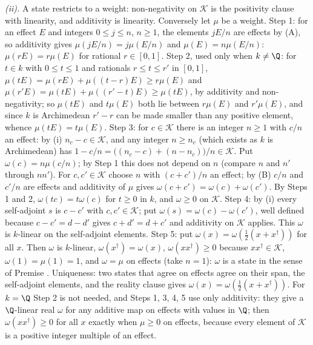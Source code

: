 \emph{(ii).} A state restricts to a weight: non-negativity on $\mathcal{K}$ is the positivity clause with linearity, and additivity is linearity. Conversely let $\mu$ be a weight. Step 1: for an effect $E$ and integers $0 \le j \le n$, $n \ge 1$, the elements $jE/n$ are effects by (A), so additivity gives $\mu(jE/n) = j\mu(E/n)$ and $\mu(E) = n\mu(E/n)$: $\mu(rE) = r\mu(E)$ for rational $r \in [0,1]$. Step 2, used only when $k \ne \Q$: for $t \in k$ with $0 \le t \le 1$ and rationals $r \le t \le r'$ in $[0,1]$, $\mu(tE) = \mu(rE) + \mu((t - r)E) \ge r\mu(E)$ and $\mu(r'E) = \mu(tE) + \mu((r' - t)E) \ge \mu(tE)$, by additivity and non-negativity; so $\mu(tE)$ and $t\mu(E)$ both lie between $r\mu(E)$ and $r'\mu(E)$, and since $k$ is Archimedean $r' - r$ can be made smaller than any positive element, whence $\mu(tE) = t\mu(E)$. Step 3: for $c \in \mathcal{K}$ there is an integer $n \ge 1$ with $c/n$ an effect: by (i) $n_{c} - c \in \mathcal{K}$, and any integer $n \ge n_{c}$ (which exists as $k$ is Archimedean) has $1 - c/n = \bigl((n_{c} - c) + (n - n_{c})\bigr)/n \in \mathcal{K}$. Put $\omega(c) = n\mu(c/n)$; by Step 1 this does not depend on $n$ (compare $n$ and $n'$ through $nn'$). For $c, c' \in \mathcal{K}$ choose $n$ with $(c + c')/n$ an effect; by (B) $c/n$ and $c'/n$ are effects and additivity of $\mu$ gives $\omega(c + c') = \omega(c) + \omega(c')$. By Steps 1 and 2, $\omega(tc) = t\omega(c)$ for $t \ge 0$ in $k$, and $\omega \ge 0$ on $\mathcal{K}$. Step 4: by (i) every self-adjoint $s$ is $c - c'$ with $c, c' \in \mathcal{K}$; put $\omega(s) = \omega(c) - \omega(c')$, well defined because $c - c' = d - d'$ gives $c + d' = d + c'$ and additivity on $\mathcal{K}$ applies. This $\omega$ is $k$-linear on the self-adjoint elements. Step 5: put $\omega(x) = \omega(\tfrac12(x + x^{\dagger}))$ for all $x$. Then $\omega$ is $k$-linear, $\omega(x^{\dagger}) = \omega(x)$, $\omega(xx^{\dagger}) \ge 0$ because $xx^{\dagger} \in \mathcal{K}$, $\omega(1) = \mu(1) = 1$, and $\omega = \mu$ on effects (take $n = 1$): $\omega$ is a state in the sense of Premise . Uniqueness: two states that agree on effects agree on their span, the self-adjoint elements, and the reality clause gives $\omega(x) = \omega(\tfrac12(x + x^{\dagger}))$. For $k = \Q$ Step 2 is not needed, and Steps 1, 3, 4, 5 use only additivity: they give a $\Q$-linear real $\omega$ for any additive map on effects with values in $\Q$; then $\omega(xx^{\dagger}) \ge 0$ for all $x$ exactly when $\mu \ge 0$ on effects, because every element of $\mathcal{K}$ is a positive integer multiple of an effect.

